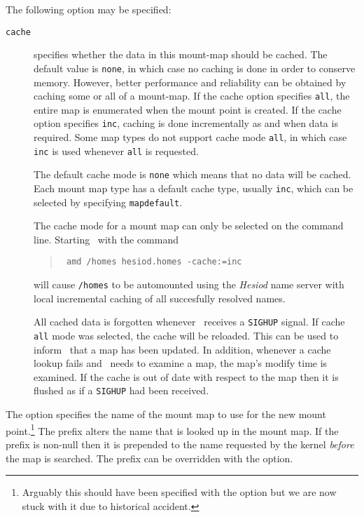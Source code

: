 The following option may be specified:
\begin{description}
\item[\tt cache]\label{afs:cache}
specifies whether the data in this mount-map should be
cached.  The default value is {\tt none}, in which case
no caching is done in order to conserve memory.
However, better performance and reliability can be obtained by caching
some or all of a mount-map.  If the cache option specifies {\tt all},
the entire map is enumerated when the mount point is created.
If the cache option specifies {\tt inc}, caching is done incrementally
as and when data is required.
Some map types do not support cache mode {\tt all}, in which case {\tt inc}
is used whenever {\tt all} is requested.

The default cache mode is {\tt none} which means that no data will be cached.
Each mount map type has a default cache type, usually {\tt inc}, which
can be selected by specifying {\tt mapdefault}.

The cache mode for a mount map can only be selected on the command line.  Starting
\amd\ with the command
\begin{quote}
\tt
amd /homes hesiod.homes -cache:=inc
\end{quote}
will cause {\tt /homes} to be automounted using the {\em Hesiod} name server with local
incremental caching of all succesfully resolved names.

All cached data is forgotten whenever \amd\ receives
a {\tt SIGHUP} signal.  If cache {\tt all} mode was selected, the
cache will be reloaded.  This can be used to inform \amd\ that a map
has been updated.  In addition, whenever a cache lookup fails and \amd\ needs
to examine a map, the map's modify time is examined.  If the cache is out
of date with respect to the map then it is flushed as if a {\tt SIGHUP} had
been received.
\end{description}

The  option specifies the name of the mount map to use for the new
mount point.\footnote{
Arguably this should have been specified with the  option but
we are now stuck with it due to historical accident.}
The prefix alters the name that is looked up in the mount map.  If the
prefix is non-null then it is prepended to the name requested by
the kernel {\em before} the map is searched.
The prefix can be overridden with the  option.


